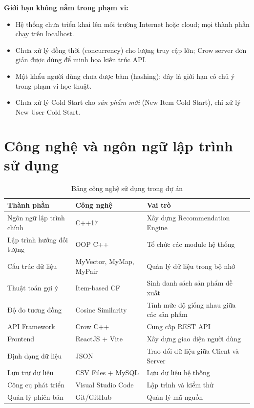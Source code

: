 \documentclass{report}
\begin{document}
\textbf{Giới hạn không nằm trong phạm vi:}
\begin{itemize}
    \item Hệ thống chưa triển khai lên môi trường Internet hoặc cloud; mọi thành phần chạy trên localhost.
    \item Chưa xử lý đồng thời (concurrency) cho lượng truy cập lớn; Crow server đơn giản được dùng để minh họa kiến trúc API.
    \item Mật khẩu người dùng chưa được băm (hashing); đây là giới hạn có chủ ý trong phạm vi học thuật.
    \item Chưa xử lý Cold Start cho \textit{sản phẩm mới} (New Item Cold Start), chỉ xử lý New User Cold Start.
\end{itemize}

\section{Công nghệ và ngôn ngữ lập trình sử dụng}

\begin{table}[H]
    \centering
    \renewcommand{\arraystretch}{1.4}
    \begin{tabularx}{\textwidth}{|l|l|>{\raggedright\arraybackslash}X|}
        \hline
        \textbf{Thành phần} & \textbf{Công nghệ} & \textbf{Vai trò} \\ \hline
        Ngôn ngữ lập trình chính & C++17 & Xây dựng Recommendation Engine \\ \hline
        Lập trình hướng đối tượng & OOP C++ & Tổ chức các module hệ thống \\ \hline
        Cấu trúc dữ liệu & MyVector, MyMap, MyPair & Quản lý dữ liệu trong bộ nhớ \\ \hline
        Thuật toán gợi ý & Item-based CF & Sinh danh sách sản phẩm đề xuất \\ \hline
        Độ đo tương đồng & Cosine Similarity & Tính mức độ giống nhau giữa các sản phẩm \\ \hline
        API Framework & Crow C++ & Cung cấp REST API \\ \hline
        Frontend & ReactJS + Vite & Xây dựng giao diện người dùng \\ \hline
        Định dạng dữ liệu & JSON & Trao đổi dữ liệu giữa Client và Server \\ \hline
        Lưu trữ dữ liệu & CSV Files + MySQL & Lưu dữ liệu hệ thống \\ \hline
        Công cụ phát triển & Visual Studio Code & Lập trình và kiểm thử \\ \hline
        Quản lý phiên bản & Git/GitHub & Quản lý mã nguồn \\ \hline
    \end{tabularx}
    \caption{Bảng công nghệ sử dụng trong dự án}
    \label{tab:cong_nghe}
\end{table}
\end{document}

